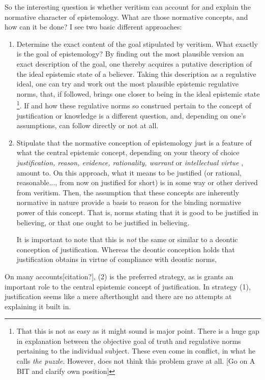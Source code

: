 \documentclass[12pt,numbers=noenddot]{scrartcl}
\begin{document}
So the interesting question is whether veritism can account for and explain the normative character of epistemology. What are those normative concepts, and how can it be done? I see two basic different approaches:

\begin{enumerate}
    \item Determine the exact content of the goal stipulated by veritism. What exactly is the goal of epistemology? By finding out the most plausible version an exact description of the goal, one thereby acquires a putative description of the ideal epistemic state of a believer. Taking this description as a regulative ideal, one can try and work out the most plausible epistemic regulative norms, that, if followed, brings one closer to being in the ideal epistemic state
    \footnote{That this is not as easy as it might sound is \textcite{Gibbons2013-GIBTNO} major point. There is a huge gap in explanation between the objective goal of truth and regulative norms pertaining to the individual subject. These even come in conflict, in what he calls \emph{the puzzle}. However, \textcite{Goldman2002-GOLTUO-2} does not think this problem grave at all. [Go on A BIT and clarify own position]}.
    If and how these regulative norms so construed pertain to the concept of justification or knowledge is a different question, and, depending on one's assumptions, can follow directly or not at all.
    \item Stipulate that the normative conception of epistemology just is a feature of what the central epistemic concept, depending on your theory of choice \emph{justification, reason, evidence, rationality, warrant} or \emph{intellectual virtue} \autocite[153]{David2001-DAVTAT-7}, amount to. On this approach, what it means to be justified (or rational, reasonable..., from now on justified for short) is in some way or other derived from veritism. Then, the assumption that these concepts are inherently normative in nature provide a basis to reason for the binding normative power of this concept. That is, norms stating that it is good to be justified in believing, or that one ought to be justified in believing.

    It is important to note that this is \emph{not} the same or similar to a deontic conception of justification. Whereas the deontic conception holds that  justification obtains in virtue of compliance with deontic norms,
\end{enumerate}

On many accounts[citation?], (2) is the preferred strategy, as is grants an important role to the central epistemic concept of justification. In strategy (1), justification seems like a mere afterthought and there are no attempts at explaining it built in.
\end{document}
